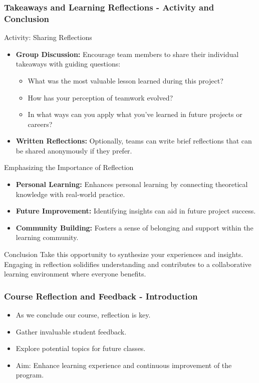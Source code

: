 \documentclass[aspectratio=169]{beamer}
\begin{document}
\begin{frame}[fragile]
  \frametitle{Takeaways and Learning Reflections - Activity and Conclusion}
  \begin{block}{Activity: Sharing Reflections}
    \begin{itemize}
      \item \textbf{Group Discussion:} 
        Encourage team members to share their individual takeaways with guiding questions:
        \begin{itemize}
          \item What was the most valuable lesson learned during this project?
          \item How has your perception of teamwork evolved?
          \item In what ways can you apply what you've learned in future projects or careers?
        \end{itemize}
      \item \textbf{Written Reflections:} 
        Optionally, teams can write brief reflections that can be shared anonymously if they prefer.
    \end{itemize}
  \end{block}

  \begin{block}{Emphasizing the Importance of Reflection}
    \begin{itemize}
      \item \textbf{Personal Learning:} Enhances personal learning by connecting theoretical knowledge with real-world practice.
      \item \textbf{Future Improvement:} Identifying insights can aid in future project success.
      \item \textbf{Community Building:} Fosters a sense of belonging and support within the learning community.
    \end{itemize}
  \end{block}

  \begin{block}{Conclusion}
    Take this opportunity to synthesize your experiences and insights. Engaging in reflection solidifies understanding and contributes to a collaborative learning environment where everyone benefits.
  \end{block}
\end{frame}

\begin{frame}[fragile]
  \frametitle{Course Reflection and Feedback - Introduction}
  \begin{itemize}
    \item As we conclude our course, reflection is key.
    \item Gather invaluable student feedback.
    \item Explore potential topics for future classes.
    \item Aim: Enhance learning experience and continuous improvement of the program.
  \end{itemize}
\end{frame}
\end{document}
